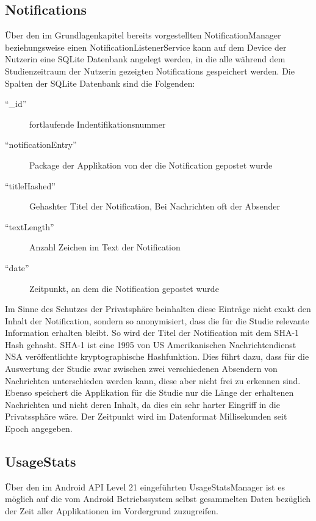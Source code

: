 \subsection{Notifications}


Über den im Grundlagenkapitel bereits vorgestellten NotificationManager beziehungsweise einen NotificationListenerService kann auf dem Device der Nutzerin eine SQLite Datenbank angelegt werden,
in die alle während dem Studienzeitraum der Nutzerin gezeigten Notifications gespeichert werden.
Die Spalten der SQLite Datenbank sind die Folgenden:
\begin{description}
    \item ["`\_id"'] fortlaufende Indentifikationsnummer
    \item ["`notificationEntry"'] Package der Applikation von der die Notification gepostet wurde
    \item ["`titleHashed"'] Gehashter Titel der Notification, Bei Nachrichten oft der Absender
    \item ["`textLength"'] Anzahl Zeichen im Text der Notification
    \item ["`date"'] Zeitpunkt, an dem die Notification gepostet wurde
\end{description}

Im Sinne des Schutzes der Privatsphäre beinhalten diese Einträge nicht exakt den Inhalt der Notification, sondern so anonymisiert, dass die für die Studie relevante Information erhalten bleibt.
So wird der Titel der Notification mit dem SHA-1 Hash\cite{sha1def} gehasht.
SHA-1 ist eine 1995 von US Amerikanischen Nachrichtendienst NSA veröffentlichte kryptographische Hashfunktion\cite{sha1proposal}.
Dies führt dazu, dass für die Auswertung der Studie zwar zwischen zwei verschiedenen Absendern von Nachrichten unterschieden werden kann, diese aber nicht frei zu erkennen sind.
Ebenso speichert die Applikation für die Studie nur die Länge der erhaltenen Nachrichten und nicht deren Inhalt, da dies ein sehr harter Eingriff in die Privatssphäre wäre.
Der Zeitpunkt wird im Datenformat Millisekunden seit Epoch angegeben.


\subsection{UsageStats}

Über den im Android API Level 21 eingeführten UsageStatsManager ist es möglich 
auf die vom Android Betriebssystem selbst gesammelten Daten bezüglich der Zeit aller Applikationen im Vordergrund zuzugreifen.


